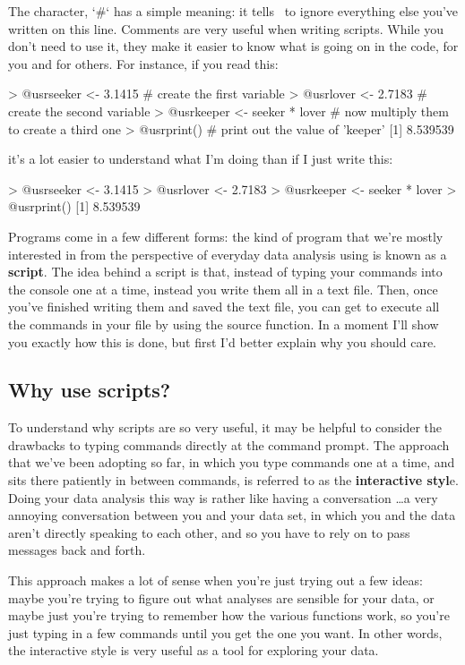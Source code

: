 The  character, \rtextverb`#` has a simple meaning: it tells \R\ to ignore everything else you've written on this line. Comments are very useful when writing scripts. While you don't need to use it, they make it easier to know what is going on in the code, for you and for others. For instance, if you read this:
\begin{rblock1}
	> @usr{seeker <- 3.1415}           # create the first variable
	> @usr{lover <- 2.7183}            # create the second variable
	> @usr{keeper <- seeker * lover}   # now multiply them to create a third one
	> @usr{print()}          		   # print out the value of 'keeper'
	[1] 8.539539
\end{rblock1}
it's a lot easier to understand what I'm doing than if I just write this:
\begin{rblock1}
	> @usr{seeker <- 3.1415}
	> @usr{lover <- 2.7183}
	> @usr{keeper <- seeker * lover}
	> @usr{print()}    
	[1] 8.539539
\end{rblock1}

Programs come in a few different forms: the kind of program that we’re mostly interested in from the perspective of everyday data analysis using \R is known as a \textbf{script}. The idea behind a script is that, instead of typing your commands into the \R console one at a time, instead you write them all in a text file. Then, once you’ve finished writing them and saved the text file, you can get \R to execute all the commands in your file by using the source function. In a moment I’ll show you exactly how this is done, but first I’d better explain why you should care.

\subsection{Why use scripts?}

To understand why scripts are so very useful, it may be helpful to consider the drawbacks to typing commands directly at the command prompt. The approach that we’ve been adopting so far, in which you type commands one at a time, and \R sits there patiently in between commands, is referred to as the \textbf{interactive styl}e. Doing your data analysis this way is rather like having a conversation \dots a very annoying conversation between you and your data set, in which you and the data aren't directly speaking to each other, and so you have to rely on \R to pass messages back and forth.

This approach makes a lot of sense when you're just trying out a few ideas: maybe you're trying to figure out what analyses are sensible for your data, or maybe just you’re trying to remember how the various \R functions work, so you’re just typing in a few commands until you get the one you want. In other words, the interactive style is very useful as a tool for exploring your data.

